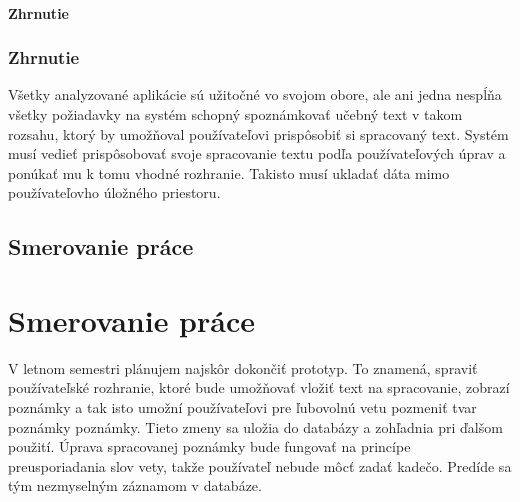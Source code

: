 %
%
{
	\subsubsection{Zhrnutie}
}
{
	\subsection{Zhrnutie}
}
Všetky analyzované aplikácie sú užitočné vo svojom obore, ale ani jedna nespĺňa všetky požiadavky na systém schopný spoznámkovať učebný text v takom rozsahu, ktorý by umožňoval používateľovi prispôsobiť si spracovaný text. Systém musí vedieť prispôsobovať svoje spracovanie textu podľa používateľových úprav a ponúkať mu k tomu vhodné rozhranie. Takisto musí ukladať dáta mimo používateľovho úložného priestoru.

%
%
{
	\section{Smerovanie práce} 
}
{
	\chapter{Smerovanie práce}
}
V letnom semestri plánujem najskôr dokončiť prototyp. To znamená, spraviť používateľské rozhranie, ktoré bude umožňovať vložiť text na spracovanie, zobrazí poznámky a tak isto umožní používateľovi pre ľubovolnú vetu pozmeniť tvar poznámky poznámky. Tieto zmeny sa uložia do databázy a zohľadnia pri ďalšom použití. Úprava spracovanej poznámky bude fungovať na princípe preusporiadania slov vety, takže používateľ nebude môcť zadať kadečo. Predíde sa tým nezmyselným záznamom v databáze.

